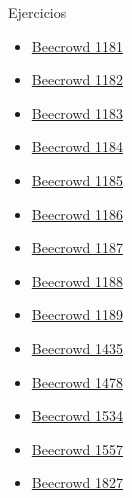 \documentclass[12pt]{beamer}
\begin{document}
\begin{frame}{Ejercicios}
    \begin{multicols}{2}
        \begin{itemize}
            \item \href{https://judge.beecrowd.com/es/problems/view/1181}{Beecrowd 1181}
            \item \href{https://judge.beecrowd.com/es/problems/view/1182}{Beecrowd 1182}
            \item \href{https://judge.beecrowd.com/es/problems/view/1183}{Beecrowd 1183}
            \item \href{https://judge.beecrowd.com/es/problems/view/1184}{Beecrowd 1184}
            \item \href{https://judge.beecrowd.com/es/problems/view/1185}{Beecrowd 1185}
            \item \href{https://judge.beecrowd.com/es/problems/view/1186}{Beecrowd 1186}
            \item \href{https://judge.beecrowd.com/es/problems/view/1187}{Beecrowd 1187}
            \item \href{https://judge.beecrowd.com/es/problems/view/1188}{Beecrowd 1188}
            \item \href{https://judge.beecrowd.com/es/problems/view/1189}{Beecrowd 1189}
            \item \href{https://judge.beecrowd.com/es/problems/view/1435}{Beecrowd 1435}
            \item \href{https://judge.beecrowd.com/es/problems/view/1478}{Beecrowd 1478}
            \item \href{https://judge.beecrowd.com/es/problems/view/1534}{Beecrowd 1534}
            \item \href{https://judge.beecrowd.com/es/problems/view/1557}{Beecrowd 1557}
            \item \href{https://judge.beecrowd.com/es/problems/view/1827}{Beecrowd 1827}
        \end{itemize}
    \end{multicols}
\end{frame}
\end{document}
